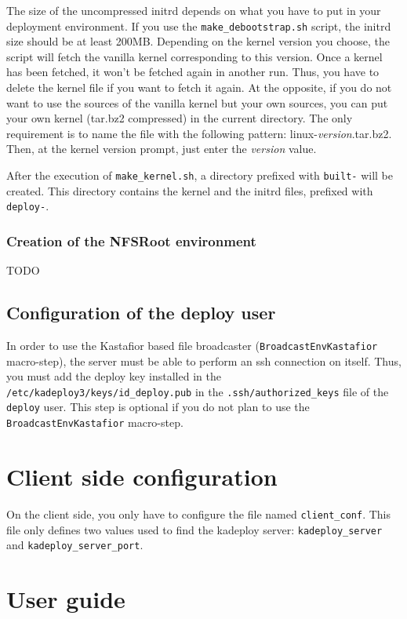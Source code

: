 \documentclass[a4wide,10pt,oneside]{book}
\begin{document}
The size of the uncompressed initrd depends on what you have to put in your deployment environment. If you use the \texttt{make\_debootstrap.sh} script, the initrd size should be at least 200MB.
Depending on the kernel version you choose, the script will fetch the vanilla kernel corresponding to this version. Once a kernel has been fetched, it won't be fetched again in another run. Thus, you have to delete the kernel file if you want to fetch it again. At the opposite, if you do not want to use the sources of the vanilla kernel but your own sources, you can put your own kernel (tar.bz2 compressed) in the current directory. The only requirement is to name the file with the following pattern: linux-\textit{version}.tar.bz2. Then, at the kernel version prompt, just enter the \textit{version} value.

After the execution of \texttt{make\_kernel.sh}, a directory prefixed with \texttt{built-} will be created. This directory contains the kernel and the initrd files, prefixed with \texttt{deploy-}.

\subsection{Creation of the NFSRoot environment}
TODO

\section{Configuration of the deploy user}
In order to use the Kastafior based file broadcaster (\texttt{BroadcastEnvKastafior} macro-step), the server must be able to perform an ssh connection on itself. Thus, you must add the deploy key installed in the \texttt{/etc/kadeploy3/keys/id\_deploy.pub} in the \texttt{.ssh/authorized\_keys} file of the \texttt{deploy} user. This step is optional if you do not plan to use the \texttt{BroadcastEnvKastafior} macro-step.

\chapter{Client side configuration}
On the client side, you only have to configure the file named \texttt{client\_conf}. This file only defines two values used to find the kadeploy server: \texttt{kadeploy\_server} and \texttt{kadeploy\_server\_port}.

\chapter{User guide}
\end{document}
